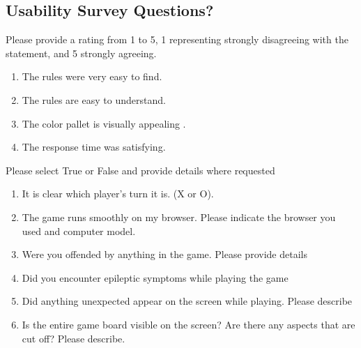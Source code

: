 \documentclass[12pt, titlepage]{article}
\begin{document}
\subsection{Usability Survey Questions?}

Please provide a rating from 1 to 5, 1 representing strongly disagreeing with the statement, and 5 strongly agreeing.
\begin{enumerate}
\item
The rules were very easy to find. \label{question:q1}
\item
The rules are easy to understand. \label{question:q2}
\item
The color pallet is visually appealing .\label{question:q4}
\item
The response time was satisfying. \label{question:q5}
\end{enumerate}
Please select True or False and provide details where requested
\begin{enumerate}
\item
It is clear which player's turn it is. (X or O). \label{question:q3}
\item
The game runs smoothly on my browser. Please indicate the browser you used and computer model. \label{question:q6}
\item
Were you offended by anything in the game. Please provide details \label{question:q8}
\item
Did you encounter epileptic symptoms while playing the game \label{question:q9}
\item
Did anything unexpected appear on the screen while playing. Please describe
\label{question:q10}
\item
Is the entire game board visible on the screen? Are there any aspects that are
cut off? Please describe. \label{question:q11}
\end{enumerate}
\end{document}
